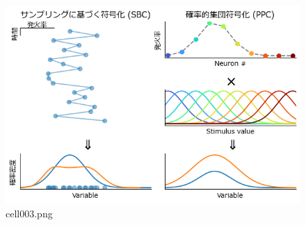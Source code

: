 \begin{figure}[ht]
	\centering
	\includegraphics[scale=0.8, max width=\linewidth]{./fig/bayesian-brain/neural-uncertainty-representation/cell003.png}
	\caption{cell003.png}
	\label{cell003.png}
\end{figure}
